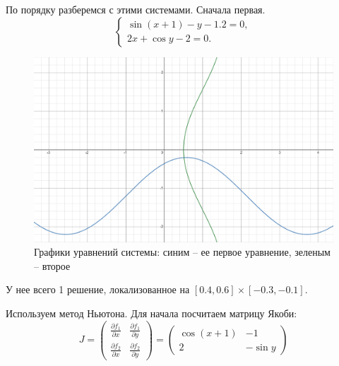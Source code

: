 		По порядку разберемся с этими системами. Сначала первая.
		\begin{equation*}
			\begin{cases}
				\sin(x + 1) - y - 1.2 = 0,\\
				2x + \cos y - 2 = 0.
			\end{cases}
		\end{equation*}
		
		\begin{figure}[h!]
			\centering
			\includegraphics[width=\linewidth]{Pictures/System1}
			\caption{Графики уравнений системы: синим -- ее первое уравнение, зеленым -- второе}
			\label{System1}
		\end{figure}
	
		У нее всего 1 решение, локализованное на $[0.4, 0.6]\times[-0.3, -0.1]$.
		
		Используем метод Ньютона. Для начала посчитаем матрицу Якоби:
		\begin{equation*}
			J = \begin{pmatrix}
				\displaystyle\frac{\partial f_1}{\partial x} & \displaystyle\frac{\partial f_1}{\partial y}\\
				\displaystyle\frac{\partial f_2}{\partial x} & \displaystyle\frac{\partial f_2}{\partial y}
			\end{pmatrix} = 
			\begin{pmatrix}
				\cos(x + 1) & -1 \\
				2 & -\sin y
 			\end{pmatrix}
		\end{equation*}
	
